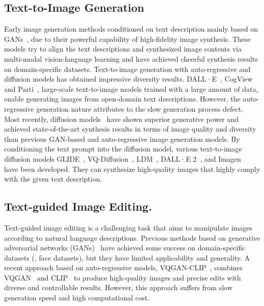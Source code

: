 \documentclass[10pt,twocolumn,letterpaper]{article}
\begin{document}
\subsection{Text-to-Image Generation}
Early image generation methods conditioned on text description mainly based on GANs~\cite{reed2016generative, zhang2017stackgan, zhang2018stackgan++, xu2018attngan, li2019controllable, brock2018large, zhu2019dm, ye2021improving, zhang2021cross, tao2022df}, due to their powerful capability of high-fidelity image synthesis. These models try to align the text descriptions and synthesized image contents via multi-modal vision-language learning and have achieved cheerful synthesis results on domain-specific datasets. 
Text-to-image generation with auto-regressive and diffusion models has obtained impressive diversity results. DALL·E~\cite{ramesh2021zero}, CogView~\cite{ding2021cogview} and Parti~\cite{yu2022parti}, large-scale text-to-image models trained with a large amount of data, enable generating images from open-domain text descriptions. However, the auto-regressive generation nature attributes to the slow generation process defect. Most recently, diffusion models~\cite{song2019generative, ho2020denoising, nichol2021improved, dhariwal2021diffusion} have shown superior generative power and achieved state-of-the-art synthesis results in terms of image quality and diversity than previous GAN-based and auto-regressive image generation models. By conditioning the text prompt into the diffusion model, various text-to-image diffusion models GLIDE~\cite{nichol2021glide}, VQ-Diffusion~\cite{gu2022vector}, LDM~\cite{rombach2022high}, DALL·E 2~\cite{ramesh2022hierarchical}, and Imagen~\cite{saharia2022photorealistic} have been developed. They can synthesize high-quality images that highly comply with the given text description. 


\subsection{Text-guided Image Editing. }
Text-guided image editing is a challenging task that aims to manipulate images according to natural language descriptions. Previous methods based on generative adversarial networks (GANs)~\cite{nam2018text, li2020manigan, xia2021tedigan, patashnik2021styleclip} have achieved some success on domain-specific datasets (\eg, face datasets), but they have limited applicability and generality. A recent approach based on auto-regressive models, VQGAN-CLIP~\cite{crowson2022vqgan}, combines VQGAN~\cite{esser2021taming} and CLIP~\cite{radford2021learning} to produce high-quality images and precise edits with diverse and controllable results. However, this approach suffers from slow generation speed and high computational cost.
\end{document}
